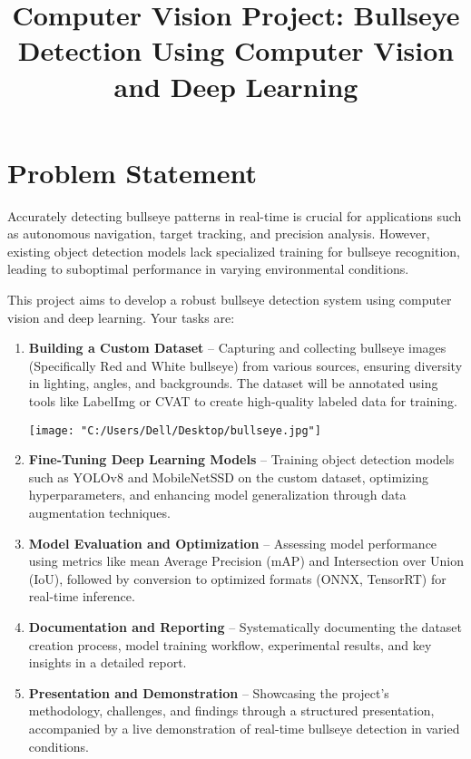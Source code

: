 \documentclass{article}
\title{Computer Vision Project: Bullseye Detection Using Computer Vision and Deep Learning}
\author{}
\date{}
\begin{document}
\maketitle

\section*{Problem Statement}

Accurately detecting bullseye patterns in real-time is crucial for applications such as autonomous navigation, target tracking, and precision analysis. However, existing object detection models lack specialized training for bullseye recognition, leading to suboptimal performance in varying environmental conditions.

\noindent This project aims to develop a robust bullseye detection system using computer vision and deep learning. Your tasks are:

\begin{enumerate}
    \item \textbf{Building a Custom Dataset} – Capturing and collecting bullseye images (Specifically Red and White bullseye) from various sources, ensuring diversity in lighting, angles, and backgrounds. The dataset will be annotated using tools like LabelImg or CVAT to create high-quality labeled data for training.
    \begin{center}
        \texttt{[image: "C:/Users/Dell/Desktop/bullseye.jpg"]}
    \end{center}

    \item \textbf{Fine-Tuning Deep Learning Models} – Training object detection models such as YOLOv8 and MobileNetSSD on the custom dataset, optimizing hyperparameters, and enhancing model generalization through data augmentation techniques.

    \item \textbf{Model Evaluation and Optimization} – Assessing model performance using metrics like mean Average Precision (mAP) and Intersection over Union (IoU), followed by conversion to optimized formats (ONNX, TensorRT) for real-time inference.

    \item \textbf{Documentation and Reporting} – Systematically documenting the dataset creation process, model training workflow, experimental results, and key insights in a detailed report.

    \item \textbf{Presentation and Demonstration} – Showcasing the project’s methodology, challenges, and findings through a structured presentation, accompanied by a live demonstration of real-time bullseye detection in varied conditions.
\end{enumerate}
\end{document}
